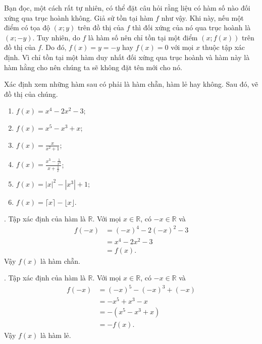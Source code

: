 Bạn đọc, một cách rất tự nhiên, có thể đặt câu hỏi rằng liệu có hàm số nào đối xứng qua trục hoành không. Giả sử tồn tại hàm $f$ như vậy. Khi này, nếu một điểm có tọa độ $\left(x; y\right)$ trên đồ thị của $f$ thì đối xứng của nó qua trục hoành là $\left(x; -y\right)$. Tuy nhiên, do $f$ là hàm số nên chỉ tồn tại một điểm $\left(x; f(x)\right)$ trên đồ thị của $f$. Do đó, $f(x) = y = -y$ hay $f(x) = 0$ với mọi $x$ thuộc tập xác định. Vì chỉ tồn tại một hàm duy nhất đối xứng qua trục hoành và hàm này là hàm hằng cho nên chúng ta sẽ không đặt tên mới cho nó.

\exercise Xác định xem những hàm sau có phải là hàm chẵn, hàm lẻ hay không. Sau đó, vẽ đồ thị của chúng.
\begin{multicols}{2}
   \begin{enumerate}
      \item $f(x) = x^4 - 2x^2 - 3$;
      \item $f(x) = x^5 - x^3 + x$;
      \item $f(x) = \frac{x}{x^2 + 1}$;
      \item $f(x) = \frac{x^3 - \frac{1}{x^3}}{x + \frac{1}{x}}$;
      \item $f(x) = |x|^2 - \left|x^3\right| + 1$;
      \item $f(x) = \lceil x \rceil - \lfloor x \rfloor$.
   \end{enumerate}
\end{multicols}

\solution 

\setcounter{subexercise}{1}
. Tập xác định của hàm là $\mathbb{R}$. Với mọi $x \in \mathbb{R}$, có $-x \in \mathbb{R}$ và
\begin{align*}
   f(-x) &= (-x)^4 - 2(-x)^2 - 3\\
   &= x^4 - 2x^2 - 3\\
   &= f(x).
\end{align*}
Vậy $f(x)$ là hàm chẵn.

. Tập xác định của hàm là $\mathbb{R}$. Với mọi $x \in \mathbb{R}$, có $-x \in \mathbb{R}$ và
\begin{align*}
   f(-x) &= (-x)^5 - (-x)^3 + (-x)\\
   &= -x^5 + x^3 - x\\
   &= -\left(x^5 - x^3 + x\right)\\
   &= -f(x).
\end{align*}
Vậy $f(x)$ là hàm lẻ.


